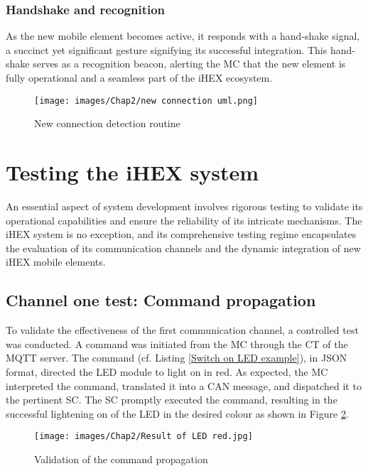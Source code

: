 \subsubsection{Handshake and recognition}
As the new mobile element becomes active, it responds with a hand-shake signal, a succinct yet significant gesture signifying its successful integration. This hand-shake serves as a recognition beacon, alerting the MC that the new element is fully operational and a seamless part of the iHEX ecosystem.

\begin{figure}[H]
\begin{center}
\texttt{[image: images/Chap2/new connection uml.png]}\\
\caption{New connection detection routine}
\label{new connection routine}
\end{center}
\end{figure}

\section{Testing the iHEX system}

An essential aspect of system development involves rigorous testing to validate its operational capabilities and ensure the reliability of its intricate mechanisms. The iHEX system is no exception, and its comprehensive testing regime encapsulates the evaluation of its communication channels and the dynamic integration of new iHEX mobile elements.

\subsection{Channel one test: Command propagation}
To validate the effectiveness of the first communication channel, a controlled test was conducted. A command was initiated from the MC through the CT of the MQTT server. The command (cf. Listing \ref{Switch on LED example}), in JSON format, directed the LED module to light on in red. As expected, the MC interpreted the command, translated it into a CAN message, and dispatched it to the pertinent SC. The SC promptly executed the command, resulting in the successful lightening on of the LED in the desired colour as shown in Figure \ref{Result of LED red.jpg}.

\begin{figure}[H]
\begin{center}
\texttt{[image: images/Chap2/Result of LED red.jpg]}\\
\caption{Validation of the command propagation}
\label{Result of LED red.jpg}
\end{center}
\end{figure}


